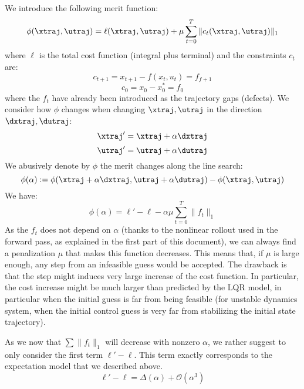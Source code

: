 \documentclass[10pt,a4paper]{article}
\begin{document}
We introduce the following merit function:
$$\phi(\xtraj,\utraj) = \ell(\xtraj,\utraj) + \mu \sum_{t=0}^T \| c_t(\xtraj,\utraj) \|_1$$
where $\ell$ is the total cost function (integral plus terminal) and the constraints $c_t$ are:
$$ c_{t+1} = x_{t+1} - f(x_t,u_t) = f_{f+1} $$
$$ c_0 = x_0 - x_0^* = f_0$$
where the $f_t$ have already been introduced as the trajectory gaps (defects).
We consider how $\phi$ changes when changing $\xtraj,\utraj$ in the direction $\dxtraj,\dutraj$:
$$\xtraj'=\xtraj + \alpha \dxtraj$$
$$\utraj'= \utraj + \alpha \dutraj$$
We abusively denote by $\phi$ the merit changes along the line search:
$$\phi(\alpha) := \phi(\xtraj + \alpha \dxtraj,\utraj + \alpha \dutraj) - \phi(\xtraj,\utraj)$$
We have:
$$\phi(\alpha) = \ell'-\ell - \alpha \mu \sum_{t=0}^T  \| f_t \|_1$$
As the $f_t$ does not depend on $\alpha$ (thanks to the nonlinear rollout used in the forward pass, as explained in the first part of this document), we can always find a penalization $\mu$ that makes this function decreases.
This means that, if $\mu$ is large enough, any step from an infeasible guess would be accepted.
The drawback is that the step might induces very large increase of the cost function.
In particular, the cost increase might be much larger than predicted by the LQR model, in particular when the initial guess is far from being feasible (for unstable dynamics system, when the initial control guess is very far from stabilizing the initial state trajectory).

As we now that $\sum \| f_t \|_1$ will decrease with nonzero $\alpha$, we rather suggest to only consider the first term $\ell'-\ell$.
This term exactly corresponds to the expectation model that we described above.
$$\ell'-\ell = \Delta(\alpha) + \mathcal O(\alpha^3)$$
\end{document}
